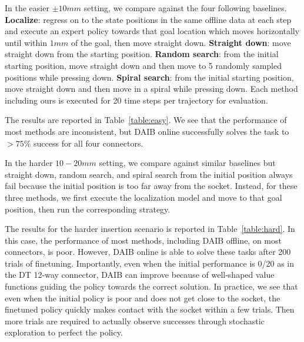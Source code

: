\documentclass[letterpaper, 10 pt, conference, final]{ieeeconf}   %
\begin{document}
In the easier $\pm10mm$ setting, we compare against the four following baselines. \textbf{Localize}: regress on to the state positions in the same offline data at each step and execute an expert policy towards that goal location which moves horizontally until within $1mm$ of the goal, then move straight down. \textbf{Straight down}: move straight down from the starting position. \textbf{Random search}: from the initial starting position, move straight down and then move to 5 randomly sampled positions while pressing down. \textbf{Spiral search}: from the initial starting position, move straight down and then move in a spiral while pressing down. Each method including ours is executed for 20 time steps per trajectory for evaluation.

The results are reported in Table~\ref{table:easy}. We see that the performance of most methods are inconsistent, but DAIB online successfully solves the task to $>75\%$ success for all four connectors.

In the harder $10-20mm$ setting, we compare against similar baselines but straight down, random search, and spiral search from the initial position always fail because the initial position is too far away from the socket. Instead, for these three methods, we first execute the localization model and move to that goal position, then run the corresponding strategy.

The results for the harder insertion scenario is reported in Table~\ref{table:hard}. In this case, the performance of most methods, including DAIB offline, on most connectors, is poor. However, DAIB online is able to solve these tasks after 200 trials of finetuning. Importantly, even when the initial performance is 0/20 as in the DT 12-way connector, DAIB can improve because of well-shaped value functions guiding the policy towards the correct solution. In practice, we see that even when the initial policy is poor and does not get close to the socket, the finetuned policy quickly makes contact with the socket within a few trials. Then more trials are required to actually observe successes through stochastic exploration to perfect the policy.




\end{document}
